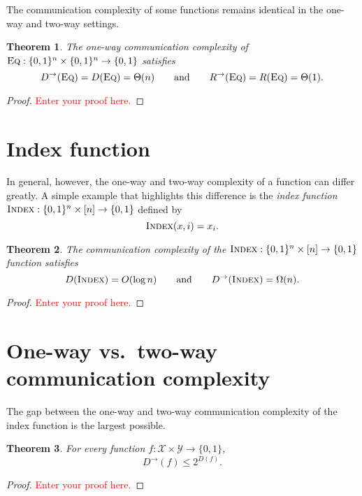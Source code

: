 \documentclass[11pt]{amsart}
\theoremstyle{plain}
\newtheorem{theorem}{Theorem}
\theoremstyle{definition}
\theoremstyle{plain}
\newcommand{\calX}{\mathcal{X}}
\newcommand{\calY}{\mathcal{Y}}
\newcommand{\Eq}{\textsc{Eq}}
\newcommand{\Index}{\textsc{Index}}
\newcommand{\replacethistext}[1]{\textcolor{red}{#1}}
\begin{document}
The communication complexity of some functions remains identical in the one-way and two-way settings.

\begin{theorem}
The one-way communication complexity of $\Eq : \{0,1\}^n \times \{0,1\}^n \to \{0,1\}$ satisfies
\[
D^\rightarrow(\Eq) = D(\Eq) = \Theta(n) \qquad \mbox{and} \qquad 
R^\rightarrow(\Eq) = R(\Eq) = \Theta(1).
\]
\end{theorem}

\begin{proof}
\replacethistext{Enter your proof here.}
\end{proof}


\newpage 
\section{Index function}

In general, however, the one-way and two-way complexity of a function can differ greatly. A simple example that highlights this difference is the \emph{index function} $\Index : \{0,1\}^n \times [n] \to \{0,1\}$ defined by
\[
\Index(x,i) = x_i.
\]

\begin{theorem}
The communication complexity of the $\Index : \{0,1\}^n \times [n] \to \{0,1\}$ function satisfies
\[
D(\Index) = O(\log n) \qquad \mbox{and} \qquad D^\rightarrow(\Index) = \Omega(n).
\]
\end{theorem}

\begin{proof}
\replacethistext{Enter your proof here.}
\end{proof}



\newpage 
\section{One-way vs.~two-way communication complexity}

The gap between the one-way and two-way communication complexity of the index function is the largest possible.

\begin{theorem}
For every function $f : \calX \times \calY \to \{0,1\}$,
\[
D^\rightarrow(f) \le 2^{D(f)}.
\]
\end{theorem}

\begin{proof}
\replacethistext{Enter your proof here.}
\end{proof}
\end{document}
